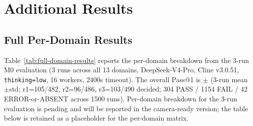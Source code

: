 \section{Additional Results}
\label{sec:additional-results}


\subsection{Full Per-Domain Results}
\label{sec:full-per-domain}

{\sloppy Table~\ref{tab:full-domain-results} reports the per-domain breakdown from the 3-run M0 evaluation (3 runs across all 13 domains, DeepSeek-V4-Pro, Cline v3.0.51, \texttt{thinking=low}, 16 workers, 2400s timeout). The overall Pass@1 is \MzeroPass{}$\pm$\MzeroStd{} (3-run mean$\pm$std; r1=105/482, r2=96/486, r3=103/490 decided; 304 PASS / 1154 FAIL / 42 ERROR-or-ABSENT across 1500 runs). Per-domain breakdown for the 3-run evaluation is pending and will be reported in the camera-ready version; the table below is retained as a placeholder for the per-domain matrix.\par}

